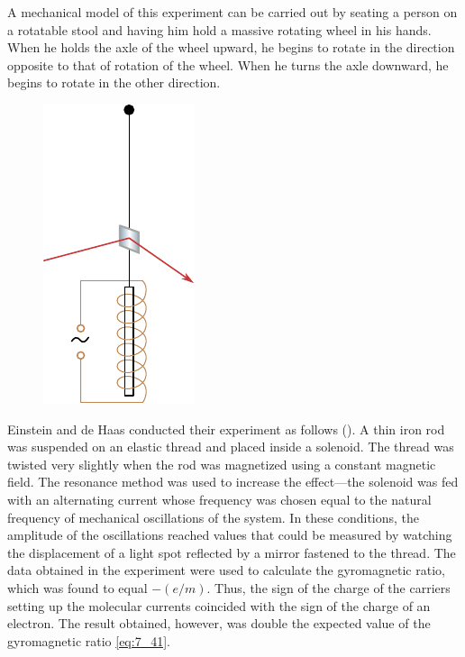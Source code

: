 A mechanical model of this experiment can be carried out by seating a person on a rotatable stool and having him hold a massive rotating wheel in his hands.
When he holds the axle of the wheel upward, he begins to rotate in the direction opposite to that of rotation of the wheel.
When he turns the axle downward, he begins to rotate in the other direction.

\begin{figure}[t]
	\begin{center}
		\includegraphics[scale=1]{figures/ch_07/fig_7_11.pdf}
		\caption[]{}
		\label{fig:7_11}
	\end{center}
	\vspace{-0.8cm}
\end{figure}

Einstein and de Haas conducted their experiment as follows ().
A thin iron rod was suspended on an elastic thread and placed inside a solenoid.
The thread was twisted very slightly when the rod was magnetized using a constant magnetic field.
The resonance method was used to increase the effect---the solenoid was fed with an alternating current whose frequency was chosen equal to the natural frequency of mechanical oscillations of the system.
In these conditions, the amplitude of the oscillations reached values that could be measured by watching the displacement of a light spot reflected by a mirror fastened to the thread.
The data obtained in the experiment were used to calculate the gyromagnetic ratio, which was found to equal $-(e/m)$.
Thus, the sign of the charge of the carriers setting up the molecular currents coincided with the sign of the charge of an electron.
The result obtained, however, was double the expected value of the gyromagnetic ratio \eqref{eq:7_41}.

